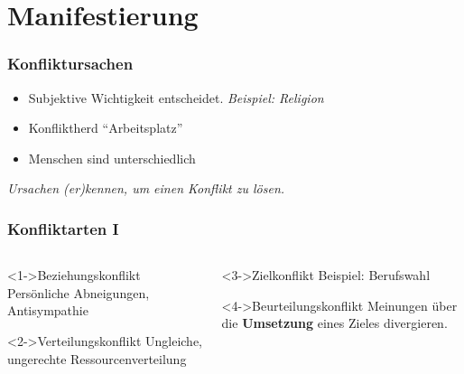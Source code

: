 \documentclass[
	ngerman,
	xcolor=dvipsnames,
	11pt
	]{beamer}
\newenvironment{annot}{\begin{block}{}\it}{\end{block}}
\begin{document}
\section{Manifestierung}
\begin{frame}
	\frametitle{Konfliktursachen}

	\begin{itemize}
		\item Subjektive Wichtigkeit entscheidet. \textit{Beispiel: Religion}
		\item Konfliktherd ``Arbeitsplatz''
		\item Menschen sind unterschiedlich
	\end{itemize}

	\hfill
	\pause
	\begin{annot}
		Ursachen (er)kennen, um einen Konflikt zu lösen.
	\end{annot}
\end{frame}

\begin{frame}
	\frametitle{Konfliktarten I}	

	\begin{columns}[t]
		\begin{column}{.5\textwidth}
			\begin{exampleblock}<1->{Beziehungskonflikt}
				Persönliche Abneigungen, Antisympathie
			\end{exampleblock}

			\begin{exampleblock}<2->{Verteilungskonflikt}
				Ungleiche, ungerechte Ressourcenverteilung	
			\end{exampleblock}	
		\end{column}
	
		\begin{column}{.5\textwidth}
			\begin{exampleblock}<3->{Zielkonflikt}
				Beispiel: Berufswahl
			\end{exampleblock}

			\begin{exampleblock}<4->{Beurteilungskonflikt}
				Meinungen über die \textbf{Umsetzung} eines Zieles divergieren.
			\end{exampleblock}
		\end{column}
	\end{columns}
\end{frame}
\end{document}
